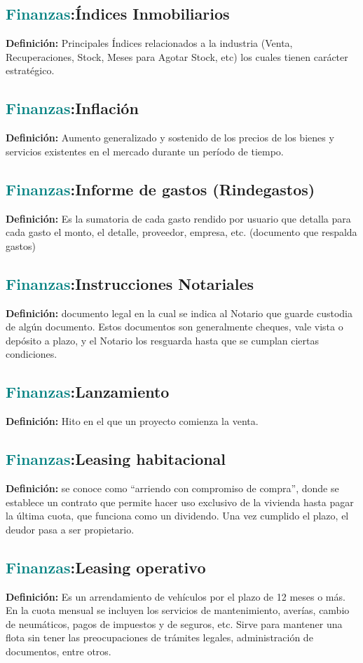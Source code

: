 \documentclass[12pt]{article}
\begin{document}
\subsection{\textcolor{teal}{Finanzas}:{Índices Inmobiliarios}}
\textbf{Definición:} Principales Índices relacionados a la industria (Venta, Recuperaciones, Stock, Meses para Agotar Stock, etc) los cuales tienen carácter estratégico.
\subsection{\textcolor{teal}{Finanzas}:{Inflación}}
\textbf{Definición:} Aumento generalizado y sostenido de los precios de los bienes y servicios existentes en el mercado durante un período de tiempo.
\subsection{\textcolor{teal}{Finanzas}:{Informe de gastos (Rindegastos)}}
\textbf{Definición:} Es la sumatoria de cada gasto rendido por usuario que detalla para cada gasto el monto, el detalle, proveedor, empresa, etc. (documento que respalda gastos)
\subsection{\textcolor{teal}{Finanzas}:{Instrucciones Notariales}}
\textbf{Definición:} documento legal en la cual se indica al Notario que guarde custodia de algún documento. Estos documentos son generalmente cheques, vale vista o depósito a plazo, y el Notario los resguarda hasta que se cumplan ciertas condiciones. 
\subsection{\textcolor{teal}{Finanzas}:{Lanzamiento}}
\textbf{Definición:} Hito en el que un proyecto comienza la venta.
\subsection{\textcolor{teal}{Finanzas}:{Leasing habitacional}}
\textbf{Definición:} se conoce como “arriendo con compromiso de compra”, donde se establece un contrato que permite hacer uso exclusivo de la vivienda hasta pagar la última cuota, que funciona como un dividendo. Una vez cumplido el plazo, el deudor pasa a ser propietario.
\subsection{\textcolor{teal}{Finanzas}:{Leasing operativo}}
\textbf{Definición:} Es un arrendamiento de vehículos por el plazo de 12 meses o más. En la cuota mensual se incluyen los servicios de mantenimiento, averías, cambio de neumáticos, pagos de impuestos y de seguros, etc. Sirve para mantener una flota sin tener las preocupaciones de trámites legales, administración de documentos, entre otros.
\end{document}
